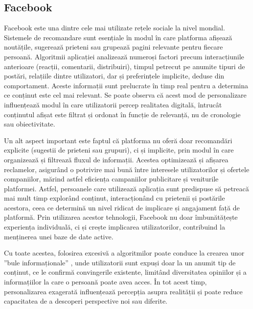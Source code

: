 \subsection*{Facebook}
Facebook este una dintre cele mai utilizate rețele sociale la nivel mondial.
Sistemele de recomandare sunt esențiale în modul în care platforma afișează noutățile, sugerează prieteni sau grupează pagini relevante pentru fiecare persoană.
Algoritmii aplicației analizează numeroși factori precum interacțiunile anterioare (reacții, comentarii, distribuiri), timpul petrecut pe anumite tipuri de postări, relațiile dintre utilizatori, dar și preferințele implicite, deduse din comportament.
Aceste informații sunt prelucrate în timp real pentru a determina ce conținut este cel mai relevant. 
Se poate observa că acest mod de personalizare influențează modul în care utilizatorii percep realitatea digitală, întrucât conținutul afișat este filtrat și ordonat în funcție de relevanță, nu de cronologie sau obiectivitate\cite{baatarjav2008group}.
\par
Un alt aspect important este faptul că platforma nu oferă doar recomandări explicite (sugestii de prieteni sau grupuri), ci și implicite, prin modul în care organizează și filtrează fluxul de informații. 
Acestea optimizează și afișarea reclamelor, asigurând o potrivire mai bună între interesele utilizatorilor și ofertele companiilor, mărind astfel eficiența campaniilor publicitare și veniturile platformei.
Astfel, persoanele care utilizează aplicația sunt predispuse să petreacă mai mult timp explorând conținut, interacționând cu prietenii și postările acestora, ceea ce determină un nivel ridicat de implicare și angajament față de platformă.
Prin utilizarea acestor tehnologii, Facebook nu doar îmbunătățește experiența individuală, ci și crește implicarea utilizatorilor, contribuind la menținerea unei baze de date active\cite{heimbach2015value}.
\par
Cu toate acestea, folosirea excesivă a algoritmilor poate conduce la crearea unor ”bule informaționale” \cite{nguyen2014exploring}, unde utilizatorii sunt expuși doar la un anumit tip de conținut, ce le confirmă convingerile existente, limitând diversitatea opiniilor și a informațiilor la care o persoană poate avea acces.
În tot acest timp, personalizarea exagerată influențează percepția asupra realității și poate reduce capacitatea de a descoperi perspective noi sau diferite.